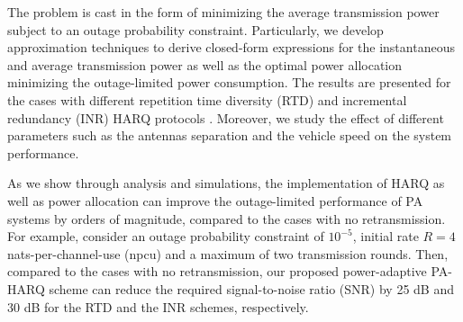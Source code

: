 The problem is cast in the form of minimizing the average transmission power subject to an outage probability constraint. Particularly, we  develop approximation techniques to derive closed-form expressions for the instantaneous and average transmission power as well as the optimal power allocation minimizing the outage-limited power consumption. The results are presented for the cases with different repetition time diversity (RTD) and incremental redundancy (INR) HARQ protocols \cite{makki2014green,chaitanya2011outage,djonin2008joint}. Moreover, we study the effect of different parameters such as the antennas separation and the vehicle speed on the system performance. 

As we show through analysis and simulations, the implementation of HARQ as well as power allocation can improve the outage-limited performance of PA systems by orders of magnitude, compared to the cases with no retransmission. For example, consider an outage probability constraint of  $10^{-5}$, initial rate $R=4$ nats-per-channel-use (npcu) and a maximum of two transmission rounds. Then, compared to the cases with no retransmission, our proposed power-adaptive PA-HARQ scheme can reduce the required signal-to-noise ratio (SNR) by  25 dB and 30 dB for the RTD and the INR schemes, respectively.












